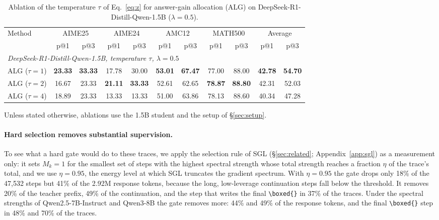 \documentclass[11pt]{article}
\newcommand{\boxedtok}{\texttt{\textbackslash boxed\{\}}}
\begin{document}
\begin{table}[t]
  \centering
  \small
  \setlength{\tabcolsep}{4pt}
  \begin{tabular}{p{4.3cm}cccccccccc}
    \toprule
    \multirow{2}{*}{Method}
    & \multicolumn{2}{c}{AIME25}
    & \multicolumn{2}{c}{AIME24}
    & \multicolumn{2}{c}{AMC12}
    & \multicolumn{2}{c}{MATH500}
    & \multicolumn{2}{c}{Average} \\
    \cmidrule(lr){2-3}
    \cmidrule(lr){4-5}
    \cmidrule(lr){6-7}
    \cmidrule(lr){8-9}
    \cmidrule(lr){10-11}
    & p@1 & p@3 & p@1 & p@3 & p@1 & p@3
    & p@1 & p@3 & p@1 & p@3 \\
    \midrule
    \multicolumn{11}{l}{\textit{DeepSeek-R1-Distill-Qwen-1.5B, temperature $\tau$, $\lambda=0.5$}} \\
    ALG ($\tau=1$)
    & \textbf{23.33} & \textbf{33.33}
    & 17.78 & 30.00
    & \textbf{53.01} & \textbf{67.47}
    & 77.00 & 88.00
    & \textbf{42.78} & \textbf{54.70} \\
    ALG ($\tau=2$)
    & 16.67 & 23.33
    & \textbf{21.11} & \textbf{33.33}
    & 52.61 & 62.65
    & \textbf{78.87} & \textbf{88.80}
    & 42.31 & 52.03 \\
    ALG ($\tau=4$)
    & 18.89 & 23.33
    & 13.33 & 13.33
    & 51.00 & 63.86
    & 78.13 & 88.60
    & 40.34 & 47.28 \\
    \bottomrule
  \end{tabular}
  \caption{Ablation of the temperature $\tau$ of Eq.~\ref{eq:z} for answer-gain allocation (ALG) on DeepSeek-R1-Distill-Qwen-1.5B ($\lambda=0.5$).}
  \label{tab:abl-tau}
\end{table}

Unless stated otherwise, ablations use the 1.5B student and the setup of \S\ref{sec:setup}.

\paragraph{Hard selection removes substantial supervision.}
\label{sec:selection-analysis}
To see what a hard gate would do to these traces, we apply the selection rule of SGL (\S\ref{sec:related}; Appendix~\ref{app:sgl}) as a measurement only: it sets $M_k=1$ for the smallest set of steps with the highest spectral strength whose total strength reaches a fraction $\eta$ of the trace's total, and we use $\eta=0.95$, the energy level at which SGL truncates the gradient spectrum.
With $\eta=0.95$ the gate drops only 18\% of the 47,532 steps but 41\% of the 2.92M response tokens, because the long, low-leverage continuation steps fall below the threshold.
It removes 20\% of the teacher prefix, 49\% of the continuation, and the step that writes the final \boxedtok{} in 37\% of the traces.
Under the spectral strengths of Qwen2.5-7B-Instruct and Qwen3-8B the gate removes more: 44\% and 49\% of the response tokens, and the final \boxedtok{} step in 48\% and 70\% of the traces.
\end{document}
